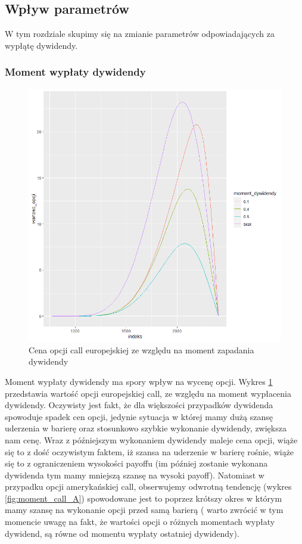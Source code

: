\documentclass[12pt]{article}
\begin{document}
\subsection{Wpływ parametrów}

W tym rozdziale skupimy się na zmianie parametrów odpowiadających za wypłątę dywidendy.

\subsubsection{Moment wypłaty dywidendy}

\begin{figure}[H]
    \centering
    \includegraphics[width=\textwidth,height=\textheight,keepaspectratio]{dividend/call_EU_procent_moment_dywidendy.png}
    \caption{Cena opcji call europejskiej ze względu na moment zapadania dywidendy}
    \label{fig:moment_call_EU}
\end{figure}

Moment wypłaty dywidendy ma spory wpływ na wycenę opcji. Wykres \ref{fig:moment_call_EU} przedstawia wartość opcji europejskiej call, ze względu na moment wypłacenia dywidendy. Oczywisty jest fakt, że dla większości przypadków dywidenda spowoduje spadek cen opcji, jedynie sytuacja w której mamy dużą szansę uderzenia w barierę oraz stosunkowo szybkie wykonanie dywidendy, zwiększa nam cenę. Wraz z późniejszym wykonaniem dywidendy maleje cena opcji, wiąże się to z dość oczywistym faktem, iż szansa na uderzenie w barierę rośnie, wiąże się to z ograniczeniem wysokości payoffu (im później zostanie wykonana dywidenda tym mamy mniejszą szansę na wysoki payoff). Natomiast w przypadku opcji amerykańskiej call, obserwujemy odwrotną tendencję (wykres \ref{fig:moment_call_A}) spowodowane jest to poprzez krótszy okres w którym mamy szansę na wykonanie opcji przed samą barierą ( warto zwrócić w tym momencie uwagę na fakt, że wartości opcji o różnych momentach wypłaty dywidend, są równe od momentu wypłaty ostatniej dywidendy).
\end{document}
